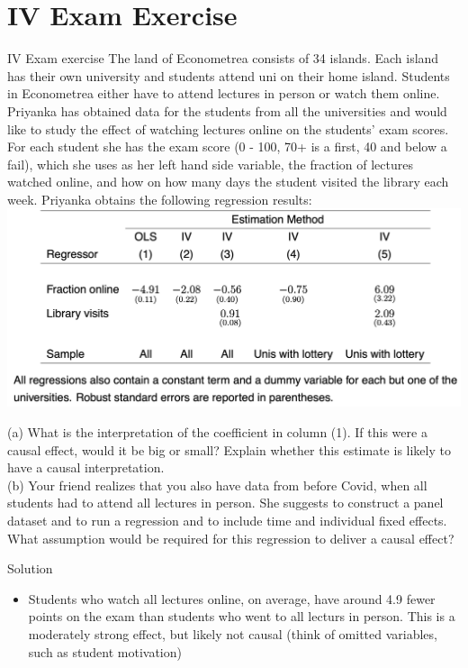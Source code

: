 \documentclass[11pt,xcolor=table]{beamer}
\begin{document}
\section{IV Exam Exercise}

\begin{frame}[allowframebreaks]{IV Exam exercise}
The land of Econometrea consists of 34 islands. Each island has their own university and students attend uni on their home island. Students in Econometrea either have to attend lectures in person or watch them online. Priyanka has obtained data for the students from all the universities and would like to study the effect of watching lectures online on the students’ exam scores. For each student she has the exam score (0 - 100, 70+ is a first, 40 and below a fail), which she uses as her left hand side variable, the fraction of lectures watched online, and how on how many days the student visited the library each week. Priyanka obtains the following regression results:\\

\framebreak 
\includegraphics[width=1.0\textwidth]{tables/IV_Table.png}

\framebreak
(a) What is the interpretation of the coefficient in column (1). If this were a causal effect, would it be big or small? Explain whether this estimate is likely to have a causal interpretation.\\

(b) Your friend realizes that you also have data from before Covid, when all students had to attend all lectures in person. She suggests to construct a panel dataset and to run a regression and to include time and individual fixed effects. What assumption would be required for this regression to deliver a causal effect?

\framebreak
\alert{Solution}
\begin{itemize}
    \item Students who watch all lectures online, on average, have around 4.9 fewer points on the exam than students who went to all lecturs in person. This is a moderately strong effect, but likely not causal (think of omitted variables, such as student motivation)
\end{itemize}
\framebreak



\end{frame}
\end{document}

